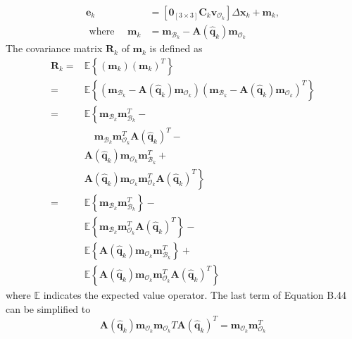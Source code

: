 $$
\begin{aligned}
\mathbf{e}_{k} &=\left[\mathbf{0}_{[3 \times 3]} \mathbf{C}_{k} \mathbf{v}_{\mathcal{O}_k}\right] \Delta \mathbf{x}_{k}+\mathbf{m}_{k}, \\
\text { where } \quad \mathbf{m}_{k} &=\mathbf{m}_{\mathcal{B}_k}-\mathbf{A}\left(\hat{\mathbf{q}}_{k}\right) \mathbf{m}_{\mathcal{O}_k}
\end{aligned}
$$
The covariance matrix $\mathbf{R}_{k}$ of $\mathbf{m}_{k}$ is defined as
$$
\begin{aligned}
\mathbf{R}_{k}=& \mathbb{E}\left\{\left(\mathbf{m}_{k}\right)\left(\mathbf{m}_{k}\right)^{T}\right\} \\
=& \mathbb{E}\left\{\left(\mathbf{m}_{\mathcal{B}_k}-\mathbf{A}\left(\hat{\mathbf{q}}_{k}\right) \mathbf{m}_{\mathcal{O}_k}\right)\left(\mathbf{m}_{\mathcal{B}_k}-\mathbf{A}\left(\hat{\mathbf{q}}_{k}\right) \mathbf{m}_{\mathcal{O}_k}\right)^{T}\right\} \\
=& \mathbb{E}\left\{\mathbf{m}_{\mathcal{B}_k} \mathbf{m}_{\mathcal{B}_k}^{T}-\right.\\
& \quad \mathbf{m}_{\mathcal{B}_k} \mathbf{m}_{\mathcal{O}_k}^{T} \mathbf{A}\left(\hat{\mathbf{q}}_{k}\right)^{T}-\\
& \mathbf{A}\left(\hat{\mathbf{q}}_{k}\right) \mathbf{m}_{\mathcal{O}_k} \mathbf{m}_{\mathcal{B}_k}^{T}+\\
&\left.\mathbf{A}\left(\hat{\mathbf{q}}_{k}\right) \mathbf{m}_{\mathcal{O}_k} \mathbf{m}_{\mathcal{O}_k}^{T} \mathbf{A}\left(\hat{\mathbf{q}}_{k}\right)^{T}\right\} \\
=& \mathbb{E}\left\{\mathbf{m}_{\mathcal{B}_k} \mathbf{m}_{\mathcal{B}_k}^{T}\right\}-\\
& \mathbb{E}\left\{\mathbf{m}_{\mathcal{B}_k} \mathbf{m}_{\mathcal{O}_k}^{T} \mathbf{A}\left(\hat{\mathbf{q}}_{k}\right)^{T}\right\}-\\
& \mathbb{E}\left\{\mathbf{A}\left(\hat{\mathbf{q}}_{k}\right) \mathbf{m}_{\mathcal{O}_k} \mathbf{m}_{\mathcal{B}_k}^{T}\right\}+\\
& \mathbb{E}\left\{\mathbf{A}\left(\hat{\mathbf{q}}_{k}\right) \mathbf{m}_{\mathcal{O}_k} \mathbf{m}_{\mathcal{O}_k}^{T} \mathbf{A}\left(\hat{\mathbf{q}}_{k}\right)^{T}\right\}
\end{aligned}
$$
where $\mathbb{E}$ indicates the expected value operator. The last term of Equation B.44 can be simplified to
$$
\mathbf{A}\left(\hat{\mathbf{q}}_{k}\right) \mathbf{m}_{\mathcal{O}_k} \mathbf{m}_{\mathcal{O}_k} T \mathbf{A}\left(\hat{\mathbf{q}}_{k}\right)^{T}=\mathbf{m}_{\mathcal{O}_k} \mathbf{m}_{\mathcal{O}_k}^{T}
$$
